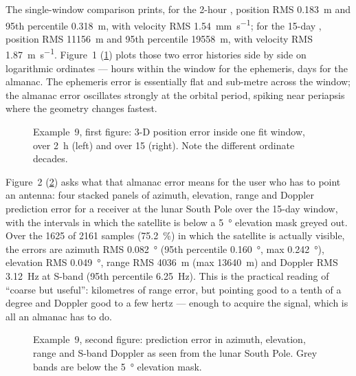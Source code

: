 The single-window comparison prints, for the 2-hour ,
position RMS \SI{0.183}{\meter} and 95th percentile \SI{0.318}{\meter}, with
velocity RMS \SI{1.54}{\milli\meter\per\second}; for the 15-day
, position RMS \SI{11156}{\meter} and 95th percentile
\SI{19558}{\meter}, with velocity RMS \SI{1.87}{\meter\per\second}. Figure~1
(\cref{fig:tut-ex9-fit}) plots those two error histories side by side on
logarithmic ordinates --- hours within the window for the ephemeris, days for
the almanac. The ephemeris error is essentially flat and sub-metre across the
window; the almanac error oscillates strongly at the orbital period, spiking
near periapsis where the geometry changes fastest.

\begin{figure}[htbp]
  \centering
  \caption{Example~9, first figure: 3-D position error inside one fit window,
            over \SI{2}{\hour} (left) and 
           over \SI{15}{\dayunit} (right). Note the different ordinate decades.}
  \label{fig:tut-ex9-fit}
\end{figure}

Figure~2 (\cref{fig:tut-ex9-user}) asks what that almanac error means for the
user who has to point an antenna: four stacked panels of azimuth, elevation,
range and Doppler prediction error for a receiver at the lunar South Pole over
the 15-day window, with the intervals in which the satellite is below a
\SI{5}{\degree} elevation mask greyed out. Over the 1625 of 2161 samples
(\SI{75.2}{\percent}) in which the satellite is actually visible, the errors are
azimuth RMS \SI{0.082}{\degree} (95th percentile \SI{0.160}{\degree}, max
\SI{0.242}{\degree}), elevation RMS \SI{0.049}{\degree}, range RMS
\SI{4036}{\meter} (max \SI{13640}{\meter}) and Doppler RMS \SI{3.12}{\hertz}
at S-band (95th percentile \SI{6.25}{\hertz}). This is the practical reading of
``coarse but useful'': kilometres of range error, but pointing good to a tenth
of a degree and Doppler good to a few hertz --- enough to acquire the signal,
which is all an almanac has to do.

\begin{figure}[htbp]
  \centering
  \caption{Example~9, second figure:  prediction error in
           azimuth, elevation, range and S-band Doppler as seen from the lunar
           South Pole. Grey bands are below the \SI{5}{\degree} elevation mask.}
  \label{fig:tut-ex9-user}
\end{figure}

